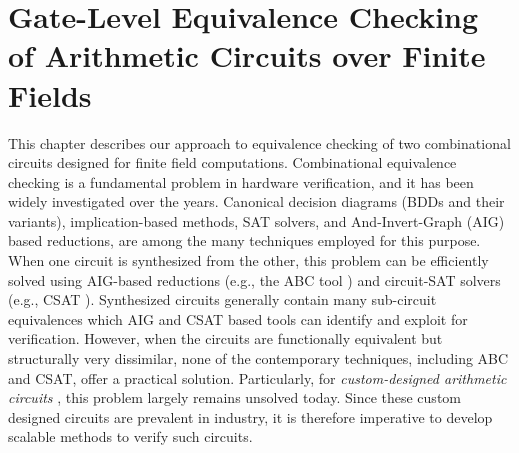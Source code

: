 \chapter{Gate-Level Equivalence Checking of Arithmetic Circuits over
Finite Fields}  %
\label{ch:ecbit} 



This chapter describes our approach to equivalence checking of two
combinational circuits designed for finite field computations. 
Combinational equivalence checking is 
a fundamental problem in hardware verification, and it has been 
widely investigated over the years. Canonical decision diagrams (BDDs
and their variants), implication-based methods, SAT solvers, and
And-Invert-Graph (AIG) based reductions, are among the many techniques
employed for this purpose. When one circuit is synthesized from the
other, this problem can be efficiently solved using AIG-based
reductions (e.g., the ABC tool \cite{abc}) and circuit-SAT solvers
(e.g., CSAT \cite{csat}). Synthesized circuits generally contain many
sub-circuit equivalences which AIG and CSAT based tools can identify
and exploit for verification. However, when the circuits are
functionally equivalent but structurally very dissimilar, none
of the contemporary techniques,  including ABC and CSAT, offer a
practical solution. Particularly, for {\it custom-designed arithmetic  
  circuits} , this  problem largely remains unsolved today. Since
these custom designed circuits are prevalent in industry, it is
therefore imperative to develop scalable methods to verify such
circuits.   

